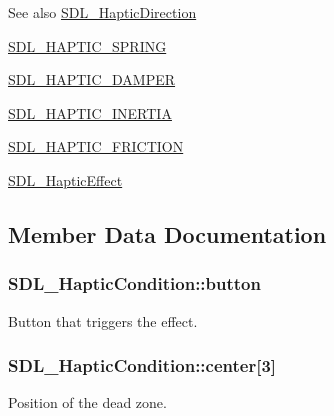 \begin{DoxySeeAlso}{See also}
\hyperlink{structSDL__HapticDirection}{S\+D\+L\+\_\+\+Haptic\+Direction} 

\hyperlink{SDL__haptic_8h_a3b52d4700380085e2b5d87bb20320fb1}{S\+D\+L\+\_\+\+H\+A\+P\+T\+I\+C\+\_\+\+S\+P\+R\+I\+N\+G} 

\hyperlink{SDL__haptic_8h_a69522f261973e3ea4273486141320a87}{S\+D\+L\+\_\+\+H\+A\+P\+T\+I\+C\+\_\+\+D\+A\+M\+P\+E\+R} 

\hyperlink{SDL__haptic_8h_a14b807471589120395aec28293cf6642}{S\+D\+L\+\_\+\+H\+A\+P\+T\+I\+C\+\_\+\+I\+N\+E\+R\+T\+I\+A} 

\hyperlink{SDL__haptic_8h_a98a5011311168d63921aaac21403a4d8}{S\+D\+L\+\_\+\+H\+A\+P\+T\+I\+C\+\_\+\+F\+R\+I\+C\+T\+I\+O\+N} 

\hyperlink{unionSDL__HapticEffect}{S\+D\+L\+\_\+\+Haptic\+Effect} 
\end{DoxySeeAlso}


\subsection{Member Data Documentation}
\hypertarget{structSDL__HapticCondition_acd35a9d432ad122bf7824b16974eac7a}{}
\subsubsection[{button}]{ S\+D\+L\+\_\+\+Haptic\+Condition\+::button}\label{structSDL__HapticCondition_acd35a9d432ad122bf7824b16974eac7a}
Button that triggers the effect. \hypertarget{structSDL__HapticCondition_a8a71ec28ff5ab85246cbc59736aa2c53}{}
\subsubsection[{center}]{ S\+D\+L\+\_\+\+Haptic\+Condition\+::center\mbox{[}3\mbox{]}}\label{structSDL__HapticCondition_a8a71ec28ff5ab85246cbc59736aa2c53}
Position of the dead zone. \hypertarget{structSDL__HapticCondition_af684c8eeeb719739a32723c00c5a2bbd}{}
